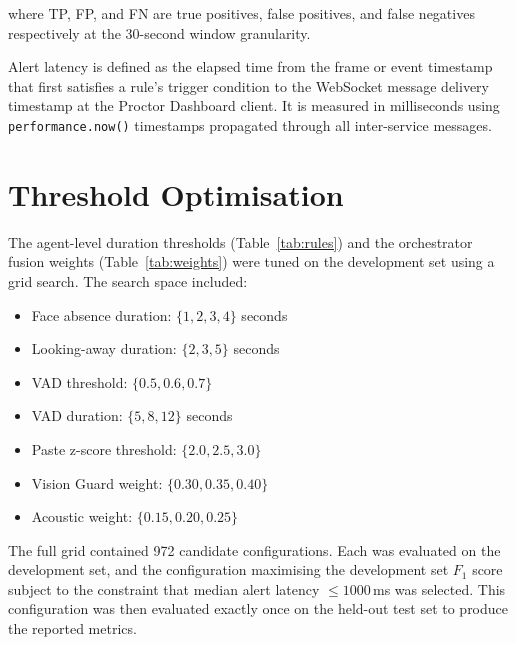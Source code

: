 where TP, FP, and FN are true positives, false positives, and false negatives respectively at the 30-second window granularity.

Alert latency is defined as the elapsed time from the frame or event timestamp that first satisfies a rule's trigger condition to the WebSocket message delivery timestamp at the Proctor Dashboard client. It is measured in milliseconds using \texttt{performance.now()} timestamps propagated through all inter-service messages.

\section{Threshold Optimisation}

The agent-level duration thresholds (Table~\ref{tab:rules}) and the orchestrator fusion weights (Table~\ref{tab:weights}) were tuned on the development set using a grid search. The search space included:

\begin{itemize}
    \item Face absence duration: $\{1, 2, 3, 4\}$ seconds
    \item Looking-away duration: $\{2, 3, 5\}$ seconds
    \item VAD threshold: $\{0.5, 0.6, 0.7\}$
    \item VAD duration: $\{5, 8, 12\}$ seconds
    \item Paste z-score threshold: $\{2.0, 2.5, 3.0\}$
    \item Vision Guard weight: $\{0.30, 0.35, 0.40\}$
    \item Acoustic weight: $\{0.15, 0.20, 0.25\}$
\end{itemize}

The full grid contained 972 candidate configurations. Each was evaluated on the development set, and the configuration maximising the development set $F_1$ score subject to the constraint that median alert latency $\leq 1000$\,ms was selected. This configuration was then evaluated exactly once on the held-out test set to produce the reported metrics.
